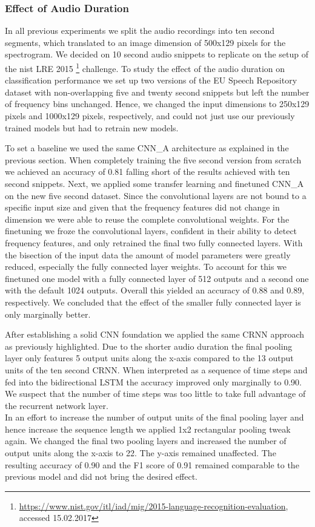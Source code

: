 \subsubsection{Effect of Audio Duration} 
\label{sec:duration}
In all previous experiments we split the audio recordings into ten second segments, which translated to an image dimension of 500x129 pixels for the spectrogram. We decided on 10 second audio snippets to replicate on the setup of the \ac{nist} LRE 2015 \footnote{\url{https://www.nist.gov/itl/iad/mig/2015-language-recognition-evaluation}, accessed 15.02.2017} challenge. To study the effect of the audio duration on classification performance we set up two versions of the EU Speech Repository dataset with non-overlapping five and twenty second snippets but left the number of frequency bins unchanged. Hence, we changed the input dimensions to 250x129 pixels and 1000x129 pixels, respectively, and could not just use our previously trained models but had to retrain new models.

To set a baseline we used the same CNN\_A architecture as explained in the previous section. When completely training the five second version from scratch we achieved an accuracy of 0.81 falling short of the results achieved with ten second snippets. Next, we applied some transfer learning and finetuned CNN\_A on the new five second dataset. Since the convolutional layers are not bound to a specific input size and given that the frequency features did not change in dimension we were able to reuse the complete  convolutional weights. For the finetuning we froze the convolutional layers, confident in their ability to detect frequency features, and only retrained the final two fully connected layers. With the bisection of the input data the amount of model parameters were greatly reduced, especially the fully connected layer weights. To account for this we finetuned one model with a fully connected layer of 512 outputs and a second one with the default 1024 outputs. Overall this yielded an accuracy of 0.88 and 0.89, respectively. We concluded that the effect of the smaller fully connected layer is only marginally better. 

After establishing a solid CNN foundation we applied the same CRNN approach as previously highlighted. Due to the shorter audio duration the final pooling layer only features 5 output units along the x-axis compared to the 13 output units of the ten second CRNN. When interpreted as a sequence of time steps and fed into the bidirectional LSTM the accuracy improved only marginally to 0.90. We suspect that the number of time steps was too little to take full advantage of the recurrent network layer.\\
In an effort to increase the number of output units of the final pooling layer and hence increase the sequence length we applied 1x2 rectangular pooling tweak again. We changed the final two pooling layers and increased the number of output units along the x-axis to 22. The y-axis remained unaffected. The resulting accuracy of 0.90 and the F1 score of 0.91 remained comparable to the previous model and did not bring the desired effect. 

